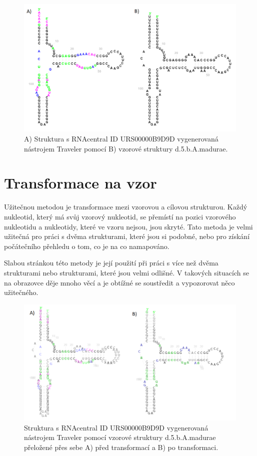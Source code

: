 \begin{figure}[H]
  \centering
  \includegraphics[width=140mm]{../img/kap03/inputDataColors.png}
  \caption{A) Struktura s RNAcentral ID URS00000B9D9D vygenerovaná nástrojem
  Traveler pomocí B) vzorové struktury d.5.b.A.madurae.}
\end{figure}

\section{Transformace na vzor}

Užitečnou metodou je transformace mezi vzorovou a cílovou strukturou. Každý
nukleotid, který má svůj vzorový nukleotid, se přemístí na pozici vzorového
nukleotidu a nukleotidy, které ve vzoru nejsou, jsou skryté. Tato metoda je
velmi užitečná pro práci s dvěma strukturami, které jsou si podobné, nebo pro
získání počátečního přehledu o tom, co je na co namapováno. 

Slabou stránkou této metody je její použití při práci s více než dvěma
strukturami nebo strukturami, které jsou velmi odlišné. V takových situacích se
na obrazovce děje mnoho věcí a je obtížné se soustředit a vypozorovat něco
užitečného.

\begin{figure}[H]
  \centering
  \includegraphics[width=140mm]{../img/kap02/animation.png}
  \caption{Struktura s RNAcentral ID URS00000B9D9D vygenerovaná nástrojem
  Traveler pomocí vzorové struktury d.5.b.A.madurae přeložené přes sebe A) před
  transformací a B) po transformaci.}
\end{figure}

